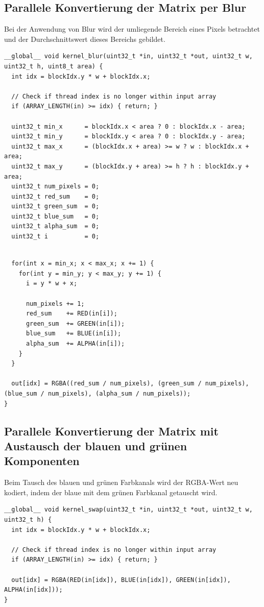 \documentclass{llncs}
\begin{document}
\subsection{Parallele Konvertierung der Matrix per Blur}
%
Bei der Anwendung von Blur wird der umliegende Bereich eines Pixels betrachtet und der Durchschnittswert dieses Bereichs gebildet.


\begin{lstlisting}
__global__ void kernel_blur(uint32_t *in, uint32_t *out, uint32_t w, uint32_t h, uint8_t area) {
  int idx = blockIdx.y * w + blockIdx.x;

  // Check if thread index is no longer within input array
  if (ARRAY_LENGTH(in) >= idx) { return; }

  uint32_t min_x      = blockIdx.x < area ? 0 : blockIdx.x - area;
  uint32_t min_y      = blockIdx.y < area ? 0 : blockIdx.y - area;
  uint32_t max_x      = (blockIdx.x + area) >= w ? w : blockIdx.x + area;
  uint32_t max_y      = (blockIdx.y + area) >= h ? h : blockIdx.y + area;
  uint32_t num_pixels = 0;
  uint32_t red_sum    = 0;
  uint32_t green_sum  = 0;
  uint32_t blue_sum   = 0;
  uint32_t alpha_sum  = 0;
  uint32_t i          = 0;
\end{lstlisting}
\newpage
\begin{lstlisting}

  for(int x = min_x; x < max_x; x += 1) {
    for(int y = min_y; y < max_y; y += 1) {
      i = y * w + x;

      num_pixels += 1;
      red_sum    += RED(in[i]);
      green_sum  += GREEN(in[i]);
      blue_sum   += BLUE(in[i]);
      alpha_sum  += ALPHA(in[i]);
    }
  }

  out[idx] = RGBA((red_sum / num_pixels), (green_sum / num_pixels), (blue_sum / num_pixels), (alpha_sum / num_pixels));
}
\end{lstlisting}
%
\subsection{Parallele Konvertierung der Matrix mit Austausch der blauen und grünen Komponenten}
%
Beim Tausch des blauen und grünen Farbkanals wird der RGBA-Wert neu kodiert, indem der blaue mit dem grünen Farbkanal getauscht wird.

\begin{lstlisting}
__global__ void kernel_swap(uint32_t *in, uint32_t *out, uint32_t w, uint32_t h) {
  int idx = blockIdx.y * w + blockIdx.x;

  // Check if thread index is no longer within input array
  if (ARRAY_LENGTH(in) >= idx) { return; }

  out[idx] = RGBA(RED(in[idx]), BLUE(in[idx]), GREEN(in[idx]), ALPHA(in[idx]));
}
\end{lstlisting}
\end{document}
